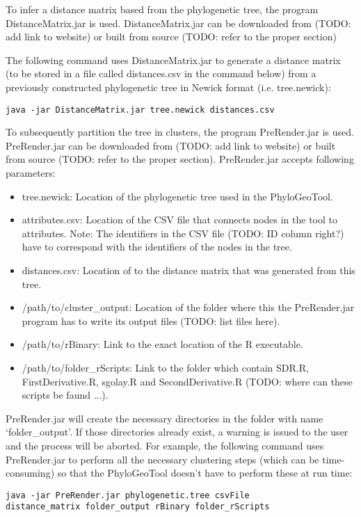 \documentclass[a4paper, 11pt]{article} %
\begin{document}
To infer a distance matrix based from the phylogenetic tree, the program DistanceMatrix.jar is used. DistanceMatrix.jar can be downloaded from (TODO: add link to website) or built from source (TODO: refer to the proper section)

The following command uses DistanceMatrix.jar to generate a distance matrix (to be stored in a file called distances.csv in the command below) from a previously constructed phylogenetic tree in Newick format (i.e. tree.newick): 
\begin{verbatim}
java -jar DistanceMatrix.jar tree.newick distances.csv
\end{verbatim}

To subsequently partition the tree in clusters, the program PreRender.jar is used. PreRender.jar can be downloaded from (TODO: add link to website) or built from source (TODO: refer to the proper section). PreRender.jar accepts following parameters:
\begin{itemize}
\item tree.newick: Location of the phylogenetic tree used in the PhyloGeoTool.
\item attributes.csv: Location of the CSV file that connects nodes in the tool to attributes. Note: The identifiers in the CSV file (TODO: ID column right?) have to correspond with the identifiers of the nodes in the tree.
\item distances.csv: Location of to the distance matrix that was generated from this tree.
\item /path/to/cluster\_output: Location of the folder where this the PreRender.jar program has to write its output files (TODO: list files here).
\item /path/to/rBinary: Link to the exact location of the R executable.
\item /path/to/folder\_rScripts: Link to the folder which contain SDR.R, FirstDerivative.R, sgolay.R and SecondDerivative.R (TODO: where can these scripts be faund ...).
\end{itemize}
PreRender.jar will create the necessary directories in the folder with name `folder\_output'.
If those directories already exist, a warning is issued to the user and the process will be aborted.
For example, the following command uses PreRender.jar to perform all the necessary clustering steps (which can be time-consuming) so that the PhyloGeoTool doesn't have to perform these at run time: 
\begin{verbatim}
java -jar PreRender.jar phylogenetic.tree csvFile
distance_matrix folder_output rBinary folder_rScripts
\end{verbatim}
\end{document}
